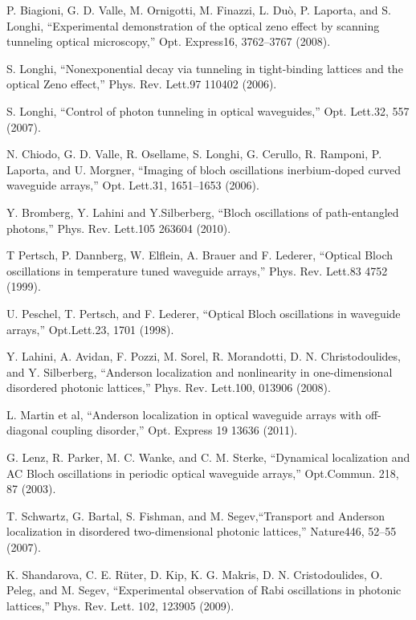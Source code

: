 \documentclass[12pt]{article}
\numberwithin{equation}{section}
\begin{document}
\begin{thebibliography}{unsrt}

 P. Biagioni, G. D. Valle, M. Ornigotti, M. Finazzi, L. Duò, P. Laporta,  and S. Longhi, “Experimental demonstration of the optical zeno effect by scanning tunneling optical microscopy,” Opt. Express16, 3762–3767 (2008).

 S. Longhi, “Nonexponential decay via tunneling in tight-binding lattices and the optical Zeno effect,” Phys. Rev. Lett.97 110402 (2006).

 S. Longhi, “Control of photon tunneling in optical waveguides,” Opt. Lett.32, 557 (2007).

 N. Chiodo, G. D. Valle, R. Osellame, S. Longhi, G. Cerullo, R. Ramponi, P. Laporta,   and U. Morgner, “Imaging of bloch oscillations inerbium-doped curved waveguide arrays,” Opt. Lett.31, 1651–1653 (2006).
	
 Y. Bromberg, Y. Lahini and Y.Silberberg, “Bloch oscillations of path-entangled photons,” Phys. Rev. Lett.105 263604 (2010).
	
 T Pertsch, P. Dannberg, W. Elflein, A. Brauer and F. Lederer, “Optical Bloch oscillations in temperature tuned waveguide arrays,” Phys. Rev. Lett.83 4752 (1999).

 U. Peschel, T. Pertsch,  and F. Lederer, “Optical Bloch oscillations in waveguide arrays,” Opt.Lett.23, 1701 (1998).

 Y. Lahini, A. Avidan, F. Pozzi, M. Sorel, R. Morandotti, D. N. Christodoulides,  and Y. Silberberg, “Anderson localization and nonlinearity in one-dimensional disordered photonic lattices,” Phys. Rev. Lett.100, 013906 (2008).
	
 L. Martin  et al, “Anderson localization in optical waveguide arrays with off-diagonal coupling disorder,” Opt. Express 19 13636 (2011).

 G. Lenz, R. Parker, M. C. Wanke, and C. M. Sterke, “Dynamical localization and AC Bloch oscillations in periodic optical waveguide arrays,” Opt.Commun. 218, 87 (2003).

 T. Schwartz, G. Bartal, S. Fishman, and M. Segev,“Transport and Anderson localization in disordered two-dimensional photonic lattices,” Nature446, 52–55 (2007).

 K. Shandarova, C. E. Rüter, D. Kip, K. G. Makris, D. N. Cristodoulides, O. Peleg, and M. Segev, “Experimental observation of Rabi oscillations in photonic lattices,” Phys. Rev.
Lett. 102, 123905 (2009).


\end{thebibliography}
\end{document}
